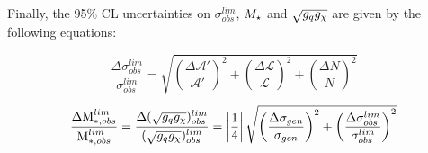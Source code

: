 Finally, the 95\% CL uncertainties on $\sigma_{obs}^{lim}$, $M_{\star}$ and $\sqrt{g_q g_{\chi}}$ are given by the following equations:

\begin{equation}
\label{uncertainty_sigma_lim}
\frac{\Delta \sigma_{obs}^{lim}}{\sigma_{obs}^{lim}} = \sqrt{\left(\frac{\Delta \mathcal{A}'}{\mathcal{A}'}\right)^{2} + \left(\frac{\Delta \mathcal{L}}{\mathcal{L}}\right)^{2} + \left(\frac{\Delta N}{N}\right)^{2}}
\end{equation}

\begin{equation}
\label{uncertainty_M_star}
\frac{\Delta \mbox{M}_{*,obs}^{lim}}{\mbox{M}_{*,obs}^{lim}} = \frac{\Delta (\sqrt{g_q g_{\chi}})_{obs}^{lim}}{(\sqrt{g_q g_{\chi}})_{obs}^{lim}} = \left|\frac{1}{4}\right|\sqrt{\left(\frac{\Delta \sigma_{gen}}{\sigma_{gen}}\right)^{2} + \left(\frac{\Delta \sigma_{obs}^{lim}}{\sigma_{obs}^{lim}}\right)^{2}}
\end{equation}


\fi

